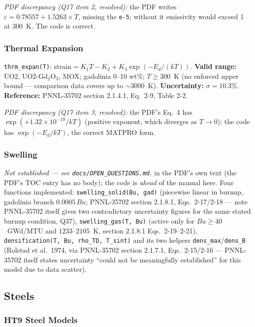 \documentclass[11pt]{article}
\newcommand{\code}[1]{\texttt{#1}}
\newcommand{\notest}{\textit{Not established --- see \code{docs/OPEN\_QUESTIONS.md}.}}
\begin{document}
\textit{PDF discrepancy (Q17 item 2, resolved):} the PDF writes
$\varepsilon = 0.78557 + 1.5263\times T$, missing the \code{e-5}; without it emissivity
would exceed 1 at 300~K. The code is correct.

\subsubsection{Thermal Expansion}

\code{thrm\_expan(T)}: $\text{strain} = K_1 T - K_2 + K_3\exp(-E_d/(kT))$.
\textbf{Valid range:} UO2, UO2-Gd$_2$O$_3$, MOX; gadolinia 0--10 wt\%; $T\ge300$~K (no
enforced upper bound --- comparison data covers up to $\sim$3000~K).
\textbf{Uncertainty:} $\sigma=10.3\%$. \textbf{Reference:} PNNL-35702 section 2.1.4.1,
Eq.\ 2-9, Table 2-2.

\textit{PDF discrepancy (Q17 item 3, resolved):} the PDF's Eq.\ 4 has
$\exp(+1.32\times10^{-19}/kT)$ (positive exponent, which diverges as $T\to0$); the code
has $\exp(-E_d/kT)$, the correct MATPRO form.

\subsubsection{Swelling}

\notest{} in the PDF's own text (the PDF's TOC entry has no body); the code is
\emph{ahead} of the manual here. Four functions implemented:
\code{swelling\_solid(Bu, gad)} (piecewise linear in burnup, gadolinia branch
$0.0005\,Bu$; PNNL-35702 section 2.1.8.1, Eqs.\ 2-17/2-18 --- note PNNL-35702 itself
gives two contradictory uncertainty figures for the same stated burnup condition,
Q37), \code{swelling\_gas(T, Bu)} (active only for $Bu\ge40$~GWd/MTU and
$1233\text{--}2105$~K, section 2.1.8.1 Eqs.\ 2-19--2-21), \code{densification(T, Bu,
rho\_TD, T\_sint)} and its two helpers \code{dens\_max}/\code{dens\_B} (Rolstad et al.\
1974, via PNNL-35702 section 2.1.7.1, Eqs.\ 2-15/2-16 --- PNNL-35702 itself states
uncertainty ``could not be meaningfully established'' for this model due to data
scatter).

\subsection{Steels}

\subsubsection{HT9 Steel Models}
\end{document}
